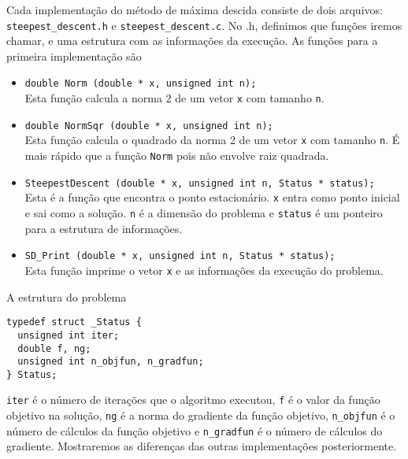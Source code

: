 \documentclass[letterpaper,11pt]{article}
\numberwithin{equation}{section}
\begin{document}
Cada implementação do método de máxima descida consiste de dois arquivos:
\verb+steepest_descent.h+ e \verb+steepest_descent.c+. No .h, definimos que funções
iremos chamar, e uma estrutura com as informações da execução. As funções para a 
primeira implementação são
\begin{itemize}
 \item \verb+double Norm (double * x, unsigned int n);+ \\
Esta função calcula a norma 2 de um vetor \verb+x+ com tamanho \verb+n+.
 \item \verb+double NormSqr (double * x, unsigned int n);+ \\
Esta função calcula o quadrado da norma 2 de um vetor \verb+x+ com tamanho \verb+n+. É mais
rápido que a função \verb+Norm+ pois não envolve raiz quadrada.
 \item \verb+SteepestDescent (double * x, unsigned int n, Status * status);+ \\
Esta é a função que encontra o ponto estacionário. \verb+x+ entra como ponto inicial e 
sai como a solução. \verb+n+ é a dimensão do problema e \verb+status+ é um ponteiro para
a estrutura de informações.
 \item \verb+SD_Print (double * x, unsigned int n, Status * status);+ \\
Esta função imprime o vetor \verb+x+ e as informações da execução do problema.
\end{itemize}
A estrutura do problema
\begin{verbatim}
typedef struct _Status {
  unsigned int iter;
  double f, ng;
  unsigned int n_objfun, n_gradfun;
} Status;
\end{verbatim}
\verb+iter+ é o número de iterações que o algoritmo executou, \verb+f+ é o valor da
função objetivo na solução, \verb+ng+ é a norma do gradiente da função objetivo,
\verb+n_objfun+ é o número de cálculos da função objetivo e \verb+n_gradfun+ é o número
de cálculos do gradiente. Mostraremos as diferenças das outras implementações posteriormente.
\end{document}
